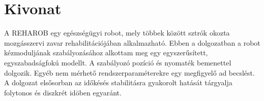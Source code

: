 \cleardoublepage{}
\chapter*{Kivonat}

A REHAROB egy egészségügyi robot, mely többek között sztrók okozta mozgásszervi 
zavar rehabilitációjában alkalmazható. Ebben a dolgozatban a robot 
kézmoduljának szabályozásához alkottam meg egy egyszerűsített, 
egyszabadságfokú modellt. A szabályozó pozíció és nyomaték bemenettel 
dolgozik. Egyéb nem mérhető rendszerparaméterekre egy megfigyelő ad becslést. 
A dolgozat elsősorban az időkésés stabilitásra gyakorolt hatását tárgyalja 
folytonos és diszkrét idöben egyaránt. 